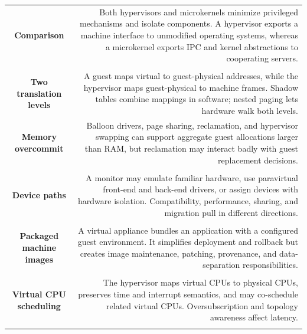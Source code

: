 \documentclass[10pt,letterpaper]{article}
\begin{document}
\begin{longtable}{C N}
\\*\hline
\textbf{Comparison} & Both hypervisors and microkernels minimize privileged mechanisms and isolate components. A hypervisor exports a machine interface to unmodified operating systems, whereas a microkernel exports IPC and kernel abstractions to cooperating servers.\\\hline
{}\\*\hline
\textbf{Two translation levels} & A guest maps virtual to guest-physical addresses, while the hypervisor maps guest-physical to machine frames. Shadow tables combine mappings in software; nested paging lets hardware walk both levels.\\\hline
\textbf{Memory overcommit} & Balloon drivers, page sharing, reclamation, and hypervisor swapping can support aggregate guest allocations larger than RAM, but reclamation may interact badly with guest replacement decisions.\\\hline
{}\\*\hline
\textbf{Device paths} & A monitor may emulate familiar hardware, use paravirtual front-end and back-end drivers, or assign devices with hardware isolation. Compatibility, performance, sharing, and migration pull in different directions.\\\hline
{}\\*\hline
\textbf{Packaged machine images} & A virtual appliance bundles an application with a configured guest environment. It simplifies deployment and rollback but creates image maintenance, patching, provenance, and data-separation responsibilities.\\\hline
{}\\*\hline
\textbf{Virtual CPU scheduling} & The hypervisor maps virtual CPUs to physical CPUs, preserves time and interrupt semantics, and may co-schedule related virtual CPUs. Oversubscription and topology awareness affect latency.\\\hline
{}\\*\hline

\end{longtable}
\end{document}

